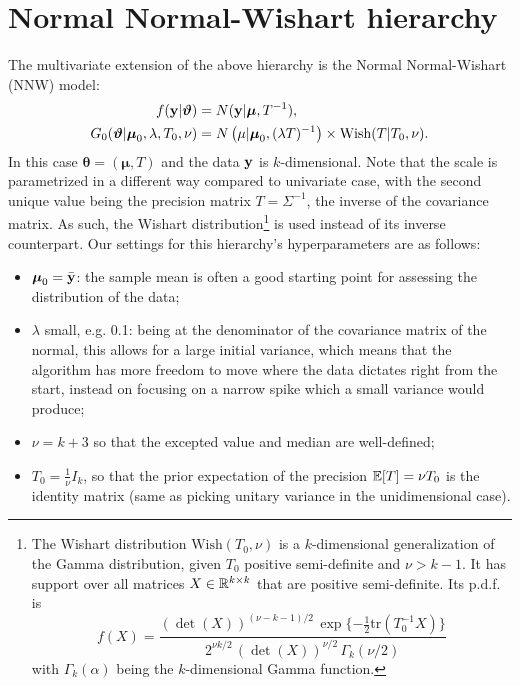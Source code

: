 \section{Normal Normal-Wishart hierarchy} \label{nnw}
The multivariate extension of the above hierarchy is the Normal Normal-Wishart (NNW) model:
\begin{equation}
	\begin{aligned}
		f(\textbf y|\boldsymbol\theta) &= N(\textbf y | \boldsymbol\mu ,T^{-1}), \\
		G_0(\boldsymbol\theta|\boldsymbol \mu_0, \lambda, T_0, \nu)
		&= N\left(\mu | \boldsymbol\mu_0, (\lambda T)^{-1}\right) \times \text{Wish}(T|T_0, \nu).
	\end{aligned}
\end{equation}
In this case $\boldsymbol\theta=(\boldsymbol\mu, T)$ and the data $\textbf y$ is $k$-dimensional.
Note that the scale is parametrized in a different way compared to univariate case, with the second unique value being the precision matrix $T = \Sigma^{-1}$, the inverse of the covariance matrix.
As such, the Wishart distribution\footnote{The Wishart distribution $\text{Wish}(T_0, \nu)$ is a $k$-dimensional generalization of the Gamma distribution, given $T_0$ positive semi-definite and $\nu > k-1$.
It has support over all matrices $X \in \RR^{k \times k}$ that are positive semi-definite.
Its p.d.f. is
$$f(X) = \frac{ (\det(X))^{(\nu-k-1)/2} \, \exp\{-\frac{1}{2} \text{tr}(T_0^{-1} X)\} }{ 2^{\nu k/2} \, (\det(X))^{\nu/2} \, \Gamma_k(\nu/2) } $$
with $\Gamma_k(\alpha)$ being the $k$-dimensional Gamma function.} is used instead of its inverse counterpart.
Our settings for this hierarchy's hyperparameters are as follows:
\begin{itemize}
	\item $\boldsymbol\mu_0 = \bar{\textbf y}$: the sample mean is often a good starting point for assessing the distribution of the data;
	\item $\lambda$ small, e.g. 0.1: being at the denominator of the covariance matrix of the normal, this allows for a large initial variance, which means that the algorithm has more freedom to move where the data dictates right from the start, instead on focusing on a narrow spike which a small variance would produce;
	\item $\nu = k + 3$ so that the excepted value and median are well-defined;
	\item $T_0 = \frac{1}{\nu} I_k$, so that the prior expectation of the precision $\EE[T] = \nu T_0$ is the identity matrix (same as picking unitary variance in the unidimensional case).
\end{itemize}
